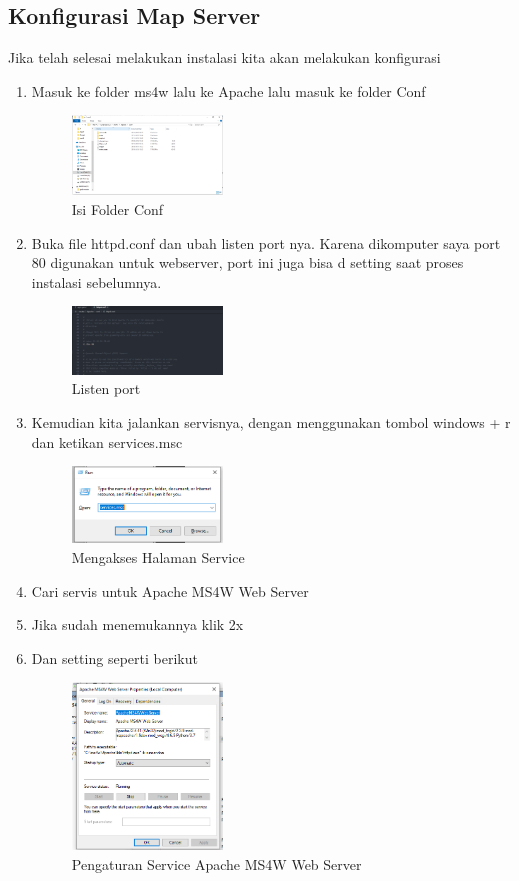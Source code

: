 \subsection{Konfigurasi Map Server}
Jika telah selesai melakukan instalasi kita akan melakukan konfigurasi
\begin{enumerate}
  \item Masuk ke folder ms4w  lalu ke Apache lalu masuk ke folder Conf
  \hfill\break
    \begin{figure}[H]
		\includegraphics[width=4cm]{figures/1174051/4/5.png}
		\centering
		\caption{Isi Folder Conf}
    \end{figure}
  \item Buka file httpd.conf dan ubah listen port nya. Karena dikomputer saya port 80 digunakan untuk webserver, port ini juga bisa d setting saat proses instalasi sebelumnya.
  \hfill\break
    \begin{figure}[H]
		\includegraphics[width=4cm]{figures/1174051/4/6.png}
		\centering
		\caption{Listen port}
    \end{figure}
  \item Kemudian kita jalankan servisnya, dengan menggunakan tombol windows + r dan ketikan services.msc
  \hfill\break
    \begin{figure}[H]
		\includegraphics[width=4cm]{figures/1174051/4/18.png}
		\centering
		\caption{Mengakses Halaman Service}
    \end{figure}
  \item Cari servis untuk Apache MS4W Web Server
  \item Jika sudah menemukannya klik 2x
  \item Dan setting seperti berikut
  \hfill\break
    \begin{figure}[H]
		\includegraphics[width=4cm]{figures/1174051/4/20.png}
		\centering
		\caption{Pengaturan Service Apache MS4W Web Server}
    \end{figure}
\end{enumerate}
